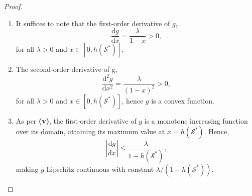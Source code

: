\documentclass[letter,11pt]{article}
\def\lp{\left(}
\def\rp{\right)}
\def\sS{\mathcal{S}}
\def\sT{\mathcal{T}}
\begin{document}
\begin{proof}
\begin{enumerate}[label=\bfseries(\roman*), leftmargin=*, itemsep=2pt]
\begin{equation}
\exp\lp \frac{-f_i(\sS)}{\lambda} \rp \geq \exp\lp \frac{-f_i(\mathcal{T})}{\lambda} \rp.
\end{equation}
Both of these quantities are nonnegative. Then, multiplying the left-hand side of \eqref{eq:multiplythis} by $\exp(-f_i(\sS)/\lambda)$ and the right-hand side by $\exp(-f_i(\mathcal{T})/\lambda)$ preserves the inequality, and we obtain
\begin{equation}
\begin{split}
\exp\lp \frac{-f_i(\sS)}{\lambda} \rp - \exp\lp \frac{-f_i(\sS \cup \{e\})}{\lambda} \rp  \geq \exp\lp \frac{-f_i(\mathcal{T})}{\lambda} \rp - \exp\lp \frac{-f_i(\sT \cup \{e\})}{\lambda} \rp.
\end{split}
\end{equation}
This demonstrates that the set function $\sS \mapsto -\exp (-f_i(\sS)/\lambda)$ is submodular for all $i \in [n]$. The addition of the constant $1$, multiplication with the nonnegative $Q_i$ and the summation through the indices $i \in [n]$ preserve submodularity, hence,
\begin{equation}
h(\sS) = \sum_{i=1}^n Q_i \lp 1 - \exp\lp \dfrac{-f_i (\sS)}{\lambda}\rp\rp
\end{equation}
is submodular.
\item It suffices to note that the first-order derivative of $g$,
\begin{equation}
\dfrac{\mathrm{d}g}{\mathrm{d}x} = \dfrac{\lambda}{1-x} > 0,
\end{equation}
for all $\lambda >0$ and $x \in [0, h(\sS^\ast)]$. 
\item The second-order derivative of g,
\begin{equation}
\dfrac{\mathrm{d}^2g}{\mathrm{d}x^2} = \dfrac{\lambda}{(1-x)^2} > 0,
\end{equation}
for all $\lambda >0$ and $x \in [0, h(\sS^\ast)]$, hence $g$ is a convex function.
\item As per \textbf{(v)}, the first-order derivative of $g$ is a monotone increasing function over its domain, attaining its maximum value at $x = h(\sS^\ast)$. Hence, 
\begin{equation}
\left\lvert\dfrac{\mathrm{d}g}{\mathrm{d}x}\right\rvert \leq \dfrac{\lambda}{1-h(\sS^\ast)},
\end{equation}
making $g$ Lipschitz continuous with constant $\lambda/(1-h(\sS^\ast))$.
\end{enumerate}
\end{proof}
\end{document}
